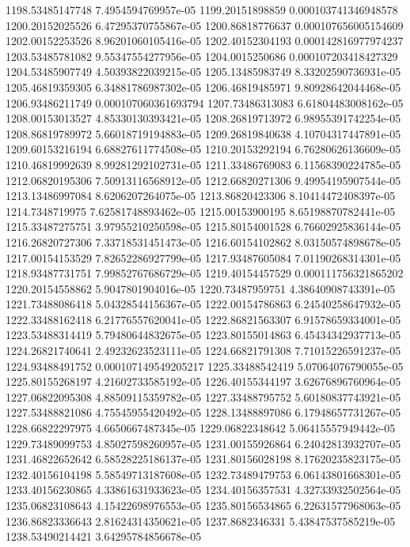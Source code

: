 {1198.53485147748 7.4954594769957e-05
1199.20151898859 0.000103741346948578
1200.20152025526 6.47295370755867e-05
1200.86818776637 0.000107656005154609
1202.00152253526 8.96201060105416e-05
1202.40152304193 0.000142816977974237
1203.53485781082 9.55347554277956e-05
1204.0015250686 0.000107203418427329
1204.53485907749 4.50393822039215e-05
1205.13485983749 8.33202590736931e-05
1205.46819359305 6.34881786987302e-05
1206.46819485971 9.80928642044468e-05
1206.93486211749 0.000107060361693794
1207.73486313083 6.61804483008162e-05
1208.00153013527 4.85330130393421e-05
1208.26819713972 6.98955391742254e-05
1208.86819789972 5.66018719194883e-05
1209.26819840638 4.10704317447891e-05
1209.60153216194 6.68827611774508e-05
1210.20153292194 6.76280626136609e-05
1210.46819992639 8.99281292102731e-05
1211.33486769083 6.11568390224785e-05
1212.06820195306 7.50913116568912e-05
1212.66820271306 9.49954195907544e-05
1213.13486997084 8.6206207264075e-05
1213.86820423306 8.10414472408397e-05
1214.7348719975 7.62581748893462e-05
1215.00153900195 8.65198870782441e-05
1215.33487275751 3.97955210250598e-05
1215.80154001528 6.76602925836144e-05
1216.26820727306 7.33718531451473e-05
1216.60154102862 8.03150574898678e-05
1217.00154153529 7.82652286927799e-05
1217.93487605084 7.01190268314301e-05
1218.93487731751 7.99852767686729e-05
1219.40154457529 0.000111756321865202
1220.20154558862 5.9047801904016e-05
1220.73487959751 4.38640908743391e-05
1221.73488086418 5.04328544156367e-05
1222.00154786863 6.24540258647932e-05
1222.33488162418 6.21776557620041e-05
1222.86821563307 6.91578659334001e-05
1223.53488314419 5.79480644832675e-05
1223.80155014863 6.45434342937713e-05
1224.26821740641 2.49232623523111e-05
1224.66821791308 7.71015226591237e-05
1224.93488491752 0.000107149549205217
1225.33488542419 5.07064076790055e-05
1225.80155268197 4.21602733585192e-05
1226.40155344197 3.62676896760964e-05
1227.06822095308 4.88509115359782e-05
1227.33488795752 5.60180837743921e-05
1227.53488821086 4.75545955420492e-05
1228.13488897086 6.17948657731267e-05
1228.66822297975 4.6650667487345e-05
1229.06822348642 5.06415557949442e-05
1229.73489099753 4.85027598260957e-05
1231.00155926864 6.24042813932707e-05
1231.46822652642 6.58528225186137e-05
1231.80156028198 8.17620235823175e-05
1232.40156104198 5.58549713187608e-05
1232.73489479753 6.06143801668301e-05
1233.40156230865 4.33861631933623e-05
1234.40156357531 4.32733932502564e-05
1235.06823108643 4.15422698976553e-05
1235.80156534865 6.22631577968063e-05
1236.86823336643 2.81624314350621e-05
1237.8682346331 5.43847537585219e-05
1238.53490214421 3.64295784856678e-05
}
